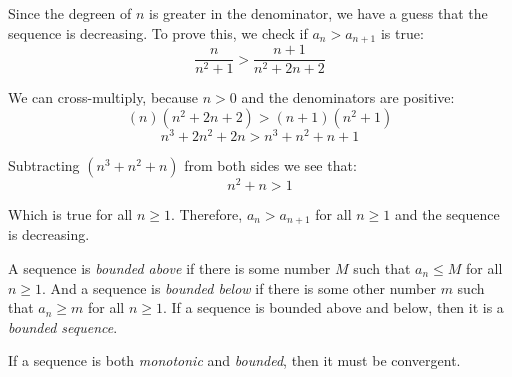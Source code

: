 Since the degreen of $n$ is greater in the denominator, we have a guess that the sequence is decreasing. To prove this, we check if $a_n > a_{n+1}$ is true:
$$\frac{n}{n^2 + 1} > \frac{n + 1}{n^2 + 2n + 2}$$

We can cross-multiply, because $n > 0$ and the denominators are positive:
$$(n)(n^2 + 2n + 2) > (n+1)(n^2 + 1)$$
$$n^3 + 2n^2 + 2n > n^3 + n^2 + n + 1$$

Subtracting $(n^3 + n^2 + n)$ from both sides we see that:
$$n^2 + n > 1$$

Which is true for all $n \geq1$. Therefore, $a_n > a_{n+1}$ for all $n \geq 1$ and the sequence is decreasing. 

A sequence is \textit{bounded above} if there is some number $M$ such that $a_n \leq M$ for all $n \geq 1$. And a sequence is \textit{bounded below} if there is some other number $m$ such that $a_n \geq m$ for all $n \geq 1$. If a sequence is bounded above and below, then it is a \textit{bounded sequence}. 

If a sequence is both \textit{monotonic} and \textit{bounded}, then it must be convergent. 
